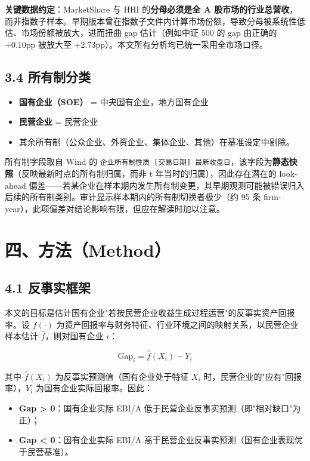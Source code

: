\documentclass[11pt,a4paper]{ctexart}
\begin{document}
\textbf{关键数据约定}：MarketShare 与 HHI 的\textbf{分母必须是全 A 股市场的行业总营收}，而非指数子样本。早期版本曾在指数子文件内计算市场份额，导致分母被系统性低估、市场份额被放大，进而扭曲 gap 估计（例如中证 500 的 gap 由正确的 +0.10pp 被放大至 +2.73pp）。本文所有分析均已统一采用全市场口径。

\subsection{3.4 所有制分类}

\begin{itemize}

  \item \textbf{国有企业（SOE）} = {中央国有企业，地方国有企业}

  \item \textbf{民营企业} = {民营企业}

  \item 其余所有制（公众企业、外资企业、集体企业、其他）在基准设定中剔除。

\end{itemize}

所有制字段取自 Wind 的 \texttt{企业所有制性质 [交易日期] 最新收盘日}，该字段为\textbf{静态快照}（反映最新时点的所有制归属，而非 t 年当时的归属），因此存在潜在的 look-ahead 偏差------若某企业在样本期内发生所有制变更，其早期观测可能被错误归入后续的所有制类别。审计显示样本期内的所有制切换者极少（约 95 条 firm-year），此项偏差对结论影响有限，但应在解读时加以注意。

\section{四、方法（Method）}

\subsection{4.1 反事实框架}

本文的目标是估计国有企业"若按民营企业收益生成过程运营"的反事实资产回报率。设 \(f(\cdot)\) 为资产回报率与财务特征、行业环境之间的映射关系，以民营企业样本估计 \(\hat{f}\)，则对国有企业 \(i\)：

\[\text{Gap}_i = \hat{f}(X_i) - Y_i\]

其中 \(\hat{f}(X_i)\) 为反事实预测值（国有企业处于特征 \(X_i\) 时，民营企业的"应有"回报率），\(Y_i\) 为国有企业实际回报率。因此：

\begin{itemize}

  \item \textbf{Gap > 0}：国有企业实际 EBI/A 低于民营企业反事实预测（即"相对缺口"为正）；

  \item \textbf{Gap < 0}：国有企业实际 EBI/A 高于民营企业反事实预测（国有企业表现优于民营基准）。

\end{itemize}
\end{document}
